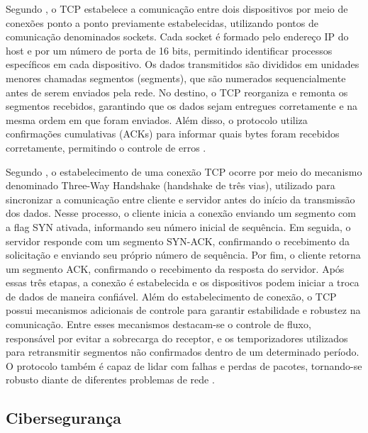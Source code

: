 \documentclass[
    12pt,                %
    openright,           %
    oneside,             %
    a4paper,             %
    english,             %
    brazil               %
]{abntex2}
\begin{document}
Segundo , o TCP estabelece a comunicação entre dois dispositivos por meio de conexões ponto a ponto previamente estabelecidas, utilizando pontos de comunicação denominados sockets. Cada socket é formado pelo endereço IP do host e por um número de porta de 16 bits, permitindo identificar processos específicos em cada dispositivo. Os dados transmitidos são divididos em unidades menores chamadas segmentos (segments), que são numerados sequencialmente antes de serem enviados pela rede. No destino, o TCP reorganiza e remonta os segmentos recebidos, garantindo que os dados sejam entregues corretamente e na mesma ordem em que foram enviados. Além disso, o protocolo utiliza confirmações cumulativas (ACKs) para informar quais bytes foram recebidos corretamente, permitindo o controle de erros \cite{Tanenbaum2011}.


Segundo , o estabelecimento de uma conexão TCP ocorre por meio do mecanismo denominado Three-Way Handshake (handshake de três vias), utilizado para sincronizar a comunicação entre cliente e servidor antes do início da transmissão dos dados. Nesse processo, o cliente inicia a conexão enviando um segmento com a flag SYN ativada, informando seu número inicial de sequência. Em seguida, o servidor responde com um segmento SYN-ACK, confirmando o recebimento da solicitação e enviando seu próprio número de sequência. Por fim, o cliente retorna um segmento ACK, confirmando o recebimento da resposta do servidor. Após essas três etapas, a conexão é estabelecida e os dispositivos podem iniciar a troca de dados de maneira confiável. Além do estabelecimento de conexão, o TCP possui mecanismos adicionais de controle para garantir estabilidade e robustez na comunicação. Entre esses mecanismos destacam-se o controle de fluxo, responsável por evitar a sobrecarga do receptor, e os temporizadores utilizados para retransmitir segmentos não confirmados dentro de um determinado período. O protocolo também é capaz de lidar com falhas e perdas de pacotes, tornando-se robusto diante de diferentes problemas de rede \cite{Tanenbaum2011}.


\subsection{Cibersegurança}
\end{document}
